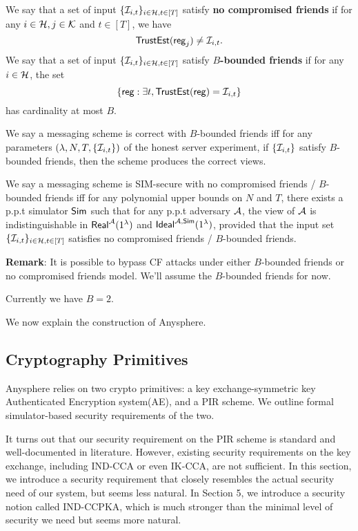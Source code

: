 \begin{definition}
We say that a set of input $\{\mathcal{I}_{i, t}\}_{i \in \mathcal{H}, t \in [T]}$ satisfy \textbf{no compromised friends} if for any $i \in \mathcal{H}, j \in \mathcal{K}$ and $t \in [T]$, we have
$$\mathsf{TrustEst}(\mathsf{reg}_j) \neq \mathcal{I}_{i, t}.$$
We say that a set of input $\{\mathcal{I}_{i, t}\}_{i \in \mathcal{H}, t \in [T]}$ satisfy \textbf{$B$-bounded friends} if for any $i \in \mathcal{H}$, the set
$$\{\mathsf{reg}: \exists t, \mathsf{TrustEst}(\mathsf{reg}) = \mathcal{I}_{i, t}\}$$
has cardinality at most $B$.

We say a messaging scheme is correct with $B$-bounded friends iff for any parameters $(\lambda, N, T, \{\mathcal{I}_{i, t}\})$ of the honest server experiment, if $\{\mathcal{I}_{i, t}\}$ satisfy $B$-bounded friends, then the scheme produces the correct views.

We say a messaging scheme is SIM-secure with no compromised friends / $B$-bounded friends iff for any polynomial upper bounds on $N$ and $T$, there exists a p.p.t simulator $\mathsf{Sim}$ such that for any p.p.t adversary $\mathcal{A}$, the view of $\mathcal{A}$ is indistinguishable in $\mathsf{Real}^{\mathcal{A}}(1^{\lambda})$ and $\mathsf{Ideal}^{\mathcal{A}, \mathsf{\mathsf{Sim}}}(1^{\lambda})$, provided that the input set $\{\mathcal{I}_{i, t}\}_{i \in \mathcal{H}, t \in [T]}$ satisfies no compromised friends / $B$-bounded friends.
\end{definition}
\textbf{Remark}: It is possible to bypass CF attacks under either $B$-bounded friends or no compromised friends model. We'll assume the $B$-bounded friends for now.

Currently we have $B = 2$.

We now explain the construction of Anysphere. 
\subsection{Cryptography Primitives}
Anysphere relies on two crypto primitives: a key exchange-symmetric key Authenticated Encryption system(AE), and a PIR scheme. We outline formal simulator-based security requirements of the two.

It turns out that our security requirement on the PIR scheme is standard and well-documented in literature. However, existing security requirements on the key exchange, including IND-CCA or even IK-CCA, are not sufficient. In this section, we introduce a security requirement that closely resembles the actual security need of our system, but seems less natural. In Section 5, we introduce a security notion called IND-CCPKA, which is much stronger than the minimal level of security we need but seems more natural.
